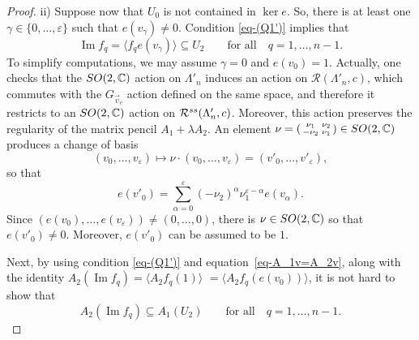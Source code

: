\documentclass[11pt]{article}
\numberwithin{equation}{section}
\numberwithin{equation}{section}
\begin{document}
\begin{proof}
 ii) Suppose now that $U_{0}$ is not contained in $\ker e$. So, there is at least one $\gamma\in \{0,\dots, \varepsilon\}$ such that
 $e(v_\gamma) \neq 0$. Condition \eqref{eq-(Q1')} implies that
 \begin{equation}
\operatorname{Im} f_{q}= \langle f_{q}e(v_{\gamma})\rangle \subseteq U_{2}\qquad\text{for all}\quad q=1,\dots,n-1 .
\label{eq-imf-in-V}
\end{equation}
To simplify computations, we may assume $\gamma =0$ and $e(v_0)=1$.
 Actually, one checks that the ${\rm SO}(2,\mathbb{C})$ action on $\Lambda'_n$ induces an action on $\mathcal{R}(\Lambda'_{n}, c)$, which commutes with the $G_{\vec{v}_c}$ action defined on the same space, and therefore it restricts to an ${\rm SO}(2,\mathbb{C})$ action on $\mathcal{R}^{\rm ss}(\Lambda'_{n}, c)$. Moreover, this action preserves the regularity of the matrix pencil
 $A_1 + \lambda A_2$. An element $\nu= \left(\begin{smallmatrix} \nu_1 & \nu_2 \\ -\nu_2 & \nu_1\end{smallmatrix}\right)\in {\rm SO}(2,\mathbb{C})$ produces a change of basis
 \[(v_0, \dots, v_{\varepsilon}) \mapsto \nu \cdot (v_0, \dots, v_{\varepsilon}) = (v'_0, \dots, v'_{\varepsilon}) ,\]
 so that
\begin{equation*}
e(v'_{0})=\sum_{\alpha=0}^{\varepsilon}(-\nu_{2})^{\alpha}\nu_{1}^{\varepsilon-\alpha}e(v_{\alpha}) .
\end{equation*}
Since $(e(v_{0}),\dots,e(v_{\varepsilon}))\neq(0,\dots,0)$, there is $\nu\in {\rm SO}(2, \mathbb{C})$ so that $e(v'_{0})\neq0$. Moreover, $e(v'_0)$ can be assumed to be $1$.

Next, by using condition \eqref{eq-(Q1')} and equation~\eqref{eq-A_1v=A_2v}, along with the identity
$A_{2}(\operatorname{Im} f_{q}) =\langle A_{2}f_{q}(1)\rangle$ $ = \langle A_{2}f_{q}(e(v_0))\rangle$, it is not hard to show that
\begin{equation}
A_{2}(\operatorname{Im} f_{q})\subseteq A_{1}(U_{2})\qquad\text{for all}\quad q=1,\dots,n-1 .
\label{eq-A_2(im-f)}
\end{equation}



\end{proof}
\end{document}

